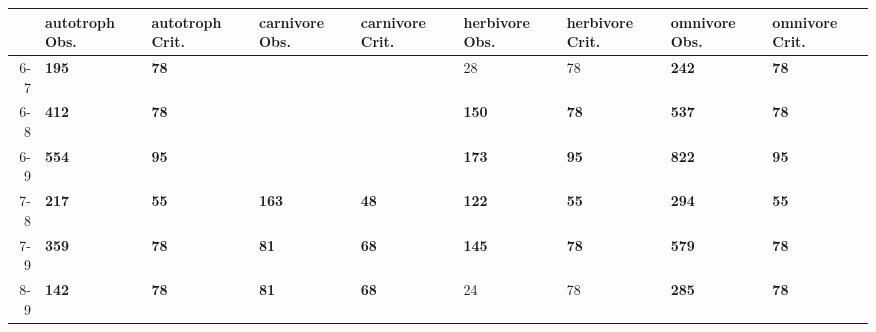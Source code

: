 \begin{table}[ht]
\centering
\begin{tabular}{rllllllll}
  \toprule
 & autotroph Obs. & autotroph Crit. & carnivore Obs. & carnivore Crit. & herbivore Obs. & herbivore Crit. & omnivore Obs. & omnivore Crit. \\ 
  \midrule
6-7 & \textbf{195} & \textbf{78} &  &  & 28 & 78 & \textbf{242} & \textbf{78} \\ 
  6-8 & \textbf{412} & \textbf{78} &  &  & \textbf{150} & \textbf{78} & \textbf{537} & \textbf{78} \\ 
  6-9 & \textbf{554} & \textbf{95} &  &  & \textbf{173} & \textbf{95} & \textbf{822} & \textbf{95} \\ 
  7-8 & \textbf{217} & \textbf{55} & \textbf{163} & \textbf{48} & \textbf{122} & \textbf{55} & \textbf{294} & \textbf{55} \\ 
  7-9 & \textbf{359} & \textbf{78} & \textbf{81} & \textbf{68} & \textbf{145} & \textbf{78} & \textbf{579} & \textbf{78} \\ 
  8-9 & \textbf{142} & \textbf{78} & \textbf{81} & \textbf{68} & 24 & 78 & \textbf{285} & \textbf{78} \\ 
   \bottomrule
\end{tabular}
\end{table}
